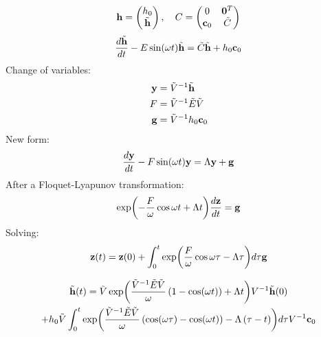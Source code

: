 \documentclass{article}[draft]
\begin{document}
\newpage
\begin{align*}
\mathbf{h} =
\begin{pmatrix}
h_0 \\
\tilde{\mathbf{h}}
\end{pmatrix}
,\quad
C = 
\begin{pmatrix}
0 & \mathbf{0}^T \\
\mathbf{c}_0 & \tilde{C}
\end{pmatrix}
\end{align*}
\begin{align*}
\frac{d \tilde{\vect{h}}}{dt} - E \sin\of{\omega t} \tilde{\vect{h}} = \tilde{C} \tilde{\vect{h}} + h_0 \vect{c}_0
\end{align*}
Change of variables:
\begin{align*}
\mathbf{y} &= \tilde{V}^{-1} \tilde{\mathbf{h}} \\
F &= \tilde{V}^{-1} \tilde{E} \tilde{V}\\
\mathbf{g} &= \tilde{V}^{-1} h_0 \mathbf{c}_0
\end{align*}
New form:
\begin{align*}
\frac{d \vect{y}}{dt} - F \sin\of{\omega t} \vect{y} = \Lambda \vect{y} + \vect{g}
\end{align*}
After a Floquet-Lyapunov transformation:
\begin{align*}
\exp\of{-\frac{F}{\omega} \cos{\omega t} + \Lambda t} \frac{d \vect{z}}{dt} = \vect{g}
\end{align*}
Solving:
\begin{align*}
\vect{z}\of{t} = \vect{z}\of{0} + \int_{0}^{t} \exp\of{\frac{F}{\omega} \cos{\omega \tau} - \Lambda \tau} d\tau \vect{g} 
\end{align*}

\begin{multline*}
\tilde{\vect{h}}\of{t} = \tilde{V} \exp\of{\frac{\tilde{V}^{-1} \tilde{E} \tilde{V}}{\omega} \left(1 - \cos\of{\omega t}\right) + \Lambda t} V^{-1} \tilde{\vect{h}}\of{0}
\\
+
h_0
\tilde{V} 
\int_{0}^{t} \exp\of{\frac{\tilde{V}^{-1} \tilde{E} \tilde{V}}{\omega} \left( \cos\of{\omega \tau} - \cos\of{\omega t} \right)  - \Lambda \left( \tau - t \right)} d\tau V^{-1} \vect{c}_0
\end{multline*}
\end{document}

